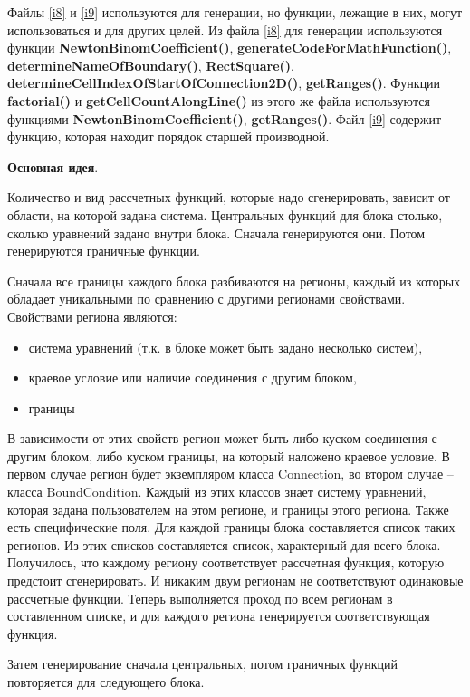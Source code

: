 \documentclass[a4paper]{article}
\begin{document}
Файлы \ref{i8} и \ref{i9} используются для генерации, но функции, лежащие в них, могут использоваться и для других целей. Из файла \ref{i8} для генерации используются функции {\bf NewtonBinomCoefficient()}, {\bf generateCodeForMathFunction()}, {\bf determineNameOfBoundary()}, {\bf RectSquare()}, {\bf de\-ter\-mi\-ne\-Cell\-In\-dex\-Of\-Start\-Of\-Con\-nec\-ti\-on2D()}, {\bf getRanges()}. Функции {\bf factorial()} и {\bf get\-Cell\-Co\-unt\-A\-long\-Li\-ne()} из этого же файла используются функциями {\bf NewtonBinomCoefficient()}, {\bf getRanges()}. Файл \ref{i9} содержит функцию, которая находит порядок старшей про\-из\-вод\-ной.

\bigskip
{\bf Основная идея}.

Количество и вид рассчетных функций, которые надо сгенерировать, зависит от области, на которой задана система. Центральных функций для блока столько, сколько уравнений задано внутри блока. Сначала генерируются они. Потом ге\-не\-ри\-ру\-ют\-ся граничные функции.

Сначала все границы каждого блока разбиваются на регионы, каждый из которых обладает уникальными по сравнению с другими регионами свойствами. Свойствами региона являются:
\begin{itemize}
\item система уравнений (т.к. в блоке может быть задано несколько систем),
\item краевое условие или наличие соединения с другим блоком,
\item границы
\end{itemize}
В зависимости от этих свойств регион может быть либо куском соединения с другим блоком, либо куском границы, на который наложено краевое условие. В первом случае регион будет экземпляром класса Connection, во втором случае -- класса BoundCondition. Каждый из этих классов знает систему уравнений, которая задана пользователем на этом регионе, и границы этого региона. Также есть специфические поля. Для каждой границы блока составляется список таких регионов. Из этих списков составляется список, характерный для всего блока. Получилось, что каждому региону соответствует рассчетная функция, которую предстоит сгенерировать. И никаким двум регионам не соответствуют одинаковые рассчетные функции. Теперь выполняется проход по всем регионам в составленном списке, и для каждого региона генерируется соответствующая функция.

Затем генерирование сначала центральных, потом граничных функций по\-вто\-ря\-ет\-ся для следующего блока.
\end{document}
